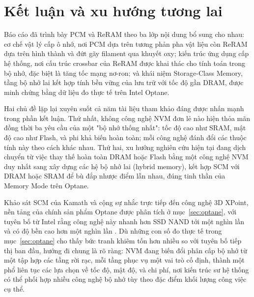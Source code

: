 \documentclass[12pt,a4paper]{article}
\begin{document}
\section{Kết luận và xu hướng tương lai}

Báo cáo đã trình bày PCM và ReRAM theo ba lớp nội dung bổ sung cho nhau: cơ chế vật lý cấp ô nhớ, nơi PCM dựa trên tương phản pha vật liệu còn ReRAM dựa trên hình thành và đứt gãy filament qua khuyết oxy; kiến trúc ứng dụng cấp hệ thống, nơi cấu trúc crossbar của ReRAM được khai thác cho tính toán trong bộ nhớ, đặc biệt là tăng tốc mạng nơ-ron; và khái niệm Storage-Class Memory, tầng bộ nhớ lai kết hợp tính bền vững của lưu trữ với tốc độ gần DRAM, được minh chứng bằng dữ liệu đo thực tế trên Intel Optane.

Hai chủ đề lặp lại xuyên suốt cả năm tài liệu tham khảo đáng được nhấn mạnh trong phần kết luận. Thứ nhất, không công nghệ NVM đơn lẻ nào hiện thỏa mãn đồng thời ba yêu cầu của một "bộ nhớ thống nhất": tốc độ cao như SRAM, mật độ cao như Flash, và phi khả biến hoàn toàn; mỗi công nghệ đánh đổi các thuộc tính này theo cách khác nhau. Thứ hai, xu hướng nghiên cứu hiện tại đang dịch chuyển từ việc thay thế hoàn toàn DRAM hoặc Flash bằng một công nghệ NVM duy nhất sang xây dựng các hệ bộ nhớ lai (hybrid memory), kết hợp SCM với DRAM hoặc SRAM để bù đắp nhược điểm lẫn nhau, đúng tinh thần của Memory Mode trên Optane.

Khảo sát SCM của Kamath và cộng sự nhắc trực tiếp đến công nghệ 3D XPoint, nền tảng của chính sản phẩm Optane được phân tích ở mục~\ref{sec:optane}, với tuyên bố từ Intel rằng công nghệ này nhanh hơn SSD NAND tới một nghìn lần và có độ bền cao hơn một nghìn lần \cite{kamath2019}. Dù những con số đo thực tế trong mục~\ref{sec:optane} cho thấy bức tranh khiêm tốn hơn nhiều so với tuyên bố tiếp thị ban đầu, hướng đi chung là rõ ràng: NVM đang biến đổi phân cấp bộ nhớ từ một tập hợp các tầng rời rạc, mỗi tầng phục vụ một vai trò cố định, thành một phổ liên tục các lựa chọn về tốc độ, mật độ, và chi phí, nơi kiến trúc sư hệ thống có thể phối hợp nhiều công nghệ bộ nhớ tùy theo đặc điểm khối lượng công việc cụ thể.

\renewcommand{\refname}{Tài liệu tham khảo}
\end{document}
